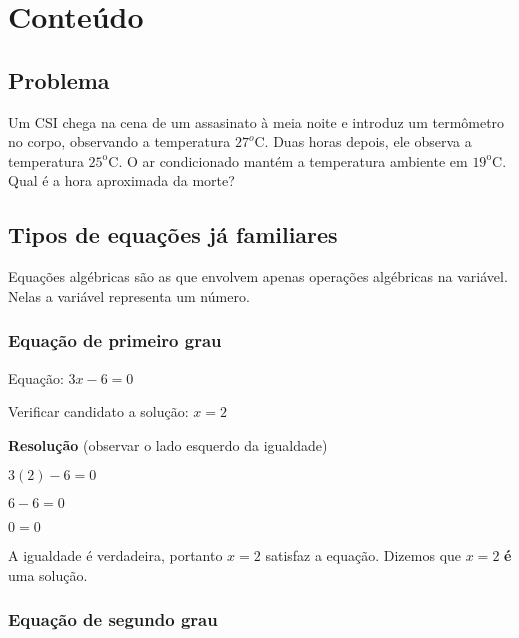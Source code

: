\documentclass[a4paper]{article}
\begin{document}


\section{Conteúdo}

\subsection{Problema}

Um CSI chega na cena de um assasinato à meia noite e introduz um
termômetro no corpo, observando a temperatura $27^o$C. Duas horas
depois, ele observa a temperatura $25^\text{o}$C. O ar condicionado
mantém a temperatura ambiente em $19^\text{o}$C. Qual é a hora
aproximada da morte?


\subsection{Tipos de equações já familiares}

Equações algébricas são as que envolvem apenas operações algébricas na
variável. Nelas a variável representa um número.

\subsubsection{Equação de primeiro grau}

Equação: $3x -6 = 0$

Verificar candidato a solução: $x=2$

{\bf Resolução} (observar o lado esquerdo da igualdade)

$3(2) - 6 =0$

$ 6-6 =0$

$0 = 0$

A igualdade é verdadeira, portanto $x=2$ satisfaz a equação. Dizemos
que $x=2$ {\bf é} uma solução.

\newpage
\subsubsection{Equação de segundo grau}
\end{document}
